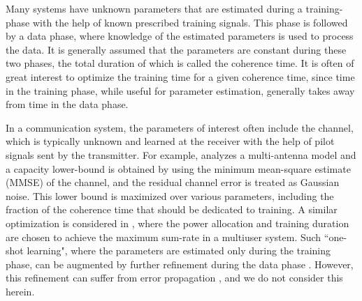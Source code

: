 \documentclass[12pt, draftclsnofoot,journal,onecolumn]{IEEEtran}
\begin{document}


Many systems have unknown parameters that are estimated during a training-phase with the help of known prescribed training signals.  This phase is followed by a data phase, where knowledge of the estimated parameters is used to process the data.  It is generally assumed that the parameters are constant during these two phases, the total duration of which is called the coherence time.  It is often of great interest to optimize the training time for a given coherence time, since time in the training phase, while useful for parameter estimation, generally takes away from time in the data phase.

In a communication system, the parameters of interest often include the channel, which is typically unknown and learned at the receiver with the help of pilot signals sent by the transmitter.   For example, \cite{hassibi2003much} analyzes a multi-antenna model and a capacity lower-bound is obtained by using the minimum mean-square estimate (MMSE) of the channel, and the residual channel error is treated as Gaussian noise.  This lower bound is maximized over various parameters, including the fraction of the coherence time that should be dedicated to training.  A similar optimization is considered in \cite{muharar2020optimal}, where the power allocation and training duration are chosen to achieve the maximum sum-rate in a multiuser system.  Such ``one-shot learning", where the parameters are estimated only during the training phase, can be augmented by further refinement during the data phase \cite{takeuchi2012large,takeuchi2013achievable}. However, this refinement can suffer from error propagation \cite{miridakis2016joint}, and we do not consider this herein. 
\end{document}
